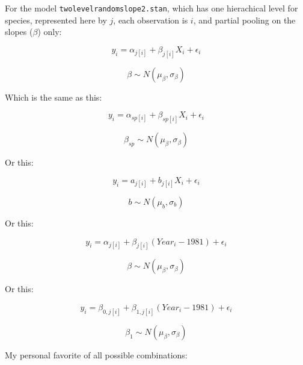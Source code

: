 \documentclass[12pt,a4paper]{article}
\begin{document}
\noindent For the model \verb|twolevelrandomslope2.stan|, which has one hierachical level for species, represented here by $j$, each observation is $i$, and partial pooling on the slopes ($\beta$) only:

\begin{equation}
y_{i}=\alpha_{j[i]}+\beta_{j[i]}X_{i}+\epsilon_{i}
\end{equation}

\begin{equation}
\beta \sim N(\mu_{\beta}, \sigma_{\beta})
\end{equation}

Which is the same as this:

\begin{equation}
y_{i}=\alpha_{sp[i]}+\beta_{sp[i]}X_{i}+\epsilon_{i}
\end{equation}

\begin{equation}
\beta_{sp} \sim N(\mu_{\beta}, \sigma_{\beta})
\end{equation}

Or this:

\begin{equation}
y_{i}=a_{j[i]}+b_{j[i]}X_{i}+\epsilon_{i}
\end{equation}

\begin{equation}
b \sim N(\mu_{b}, \sigma_{b})
\end{equation}

Or this:

\begin{equation}
y_{i}=\alpha_{j[i]}+\beta_{j[i]}(Year_{i}-1981)+\epsilon_{i}
\end{equation}

\begin{equation}
\beta \sim N(\mu_{\beta}, \sigma_{\beta})
\end{equation}

Or this:

\begin{equation}
y_{i}=\beta_{0,j[i]}+\beta_{1,j[i]}(Year_{i}-1981)+\epsilon_{i}
\end{equation}

\begin{equation}
\beta_{1} \sim N(\mu_{\beta}, \sigma_{\beta})
\end{equation}

\vspace{3ex}
My personal favorite of all possible combinations:
\end{document}
